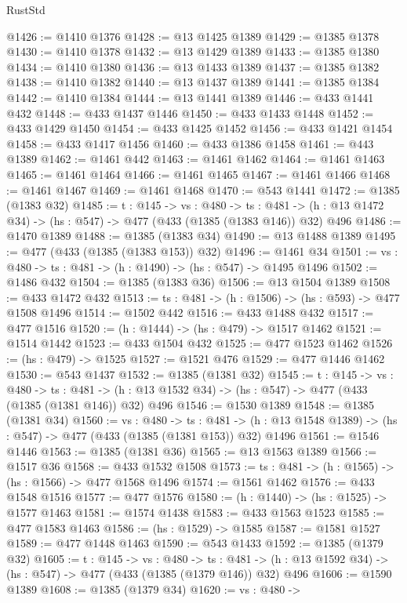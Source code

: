 \begin{lexlean}{RustStd}
\begin{coremodule}
@1426 := @1410 @1376
@1428 := @13 @1425 @1389
@1429 := @1385 @1378
@1430 := @1410 @1378
@1432 := @13 @1429 @1389
@1433 := @1385 @1380
@1434 := @1410 @1380
@1436 := @13 @1433 @1389
@1437 := @1385 @1382
@1438 := @1410 @1382
@1440 := @13 @1437 @1389
@1441 := @1385 @1384
@1442 := @1410 @1384
@1444 := @13 @1441 @1389
@1446 := @433 @1441 @432
@1448 := @433 @1437 @1446
@1450 := @433 @1433 @1448
@1452 := @433 @1429 @1450
@1454 := @433 @1425 @1452
@1456 := @433 @1421 @1454
@1458 := @433 @1417 @1456
@1460 := @433 @1386 @1458
@1461 := @443 @1389
@1462 := @1461 @442
@1463 := @1461 @1462
@1464 := @1461 @1463
@1465 := @1461 @1464
@1466 := @1461 @1465
@1467 := @1461 @1466
@1468 := @1461 @1467
@1469 := @1461 @1468
@1470 := @543 @1441
@1472 := @1385 (@1383 @32)
@1485 := {t : @145} ->
  {vs : @480} ->
  {ts : @481} -> (h : @13 @1472 @34) -> (hs : @547) -> @477 (@433 (@1385 (@1383 @146)) @32) @496
@1486 := @1470 @1389
@1488 := @1385 (@1383 @34)
@1490 := @13 @1488 @1389
@1495 := @477 (@433 (@1385 (@1383 @153)) @32)
@1496 := @1461 @34
@1501 := {vs : @480} -> {ts : @481} -> (h : @1490) -> (hs : @547) -> @1495 @1496
@1502 := @1486 @432
@1504 := @1385 (@1383 @36)
@1506 := @13 @1504 @1389
@1508 := @433 @1472 @432
@1513 := {ts : @481} -> (h : @1506) -> (hs : @593) -> @477 @1508 @1496
@1514 := @1502 @442
@1516 := @433 @1488 @432
@1517 := @477 @1516
@1520 := (h : @1444) -> (hs : @479) -> @1517 @1462
@1521 := @1514 @1442
@1523 := @433 @1504 @432
@1525 := @477 @1523 @1462
@1526 := (hs : @479) -> @1525
@1527 := @1521 @476
@1529 := @477 @1446 @1462
@1530 := @543 @1437
@1532 := @1385 (@1381 @32)
@1545 := {t : @145} ->
  {vs : @480} ->
  {ts : @481} -> (h : @13 @1532 @34) -> (hs : @547) -> @477 (@433 (@1385 (@1381 @146)) @32) @496
@1546 := @1530 @1389
@1548 := @1385 (@1381 @34)
@1560 := {vs : @480} ->
  {ts : @481} -> (h : @13 @1548 @1389) -> (hs : @547) -> @477 (@433 (@1385 (@1381 @153)) @32) @1496
@1561 := @1546 @1446
@1563 := @1385 (@1381 @36)
@1565 := @13 @1563 @1389
@1566 := @1517 @36
@1568 := @433 @1532 @1508
@1573 := {ts : @481} -> (h : @1565) -> (hs : @1566) -> @477 @1568 @1496
@1574 := @1561 @1462
@1576 := @433 @1548 @1516
@1577 := @477 @1576
@1580 := (h : @1440) -> (hs : @1525) -> @1577 @1463
@1581 := @1574 @1438
@1583 := @433 @1563 @1523
@1585 := @477 @1583 @1463
@1586 := (hs : @1529) -> @1585
@1587 := @1581 @1527
@1589 := @477 @1448 @1463
@1590 := @543 @1433
@1592 := @1385 (@1379 @32)
@1605 := {t : @145} ->
  {vs : @480} ->
  {ts : @481} -> (h : @13 @1592 @34) -> (hs : @547) -> @477 (@433 (@1385 (@1379 @146)) @32) @496
@1606 := @1590 @1389
@1608 := @1385 (@1379 @34)
@1620 := {vs : @480} ->

\end{coremodule}
\end{lexlean}
